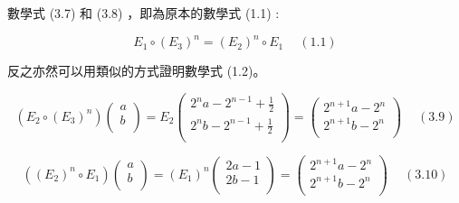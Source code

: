 \documentclass[11pt,UTF8]{ctexart}
\begin{document}
數學式 (3.7) 和 (3.8) ，即為原本的數學式 (1.1) :

$$E_{1} \circ (E_{3})^n = (E_{2})^n \circ E_{1} \quad \ (1.1) $$

反之亦然可以用類似的方式證明數學式 (1.2)。

$$(E_2 \circ {(E_3)}^n)\left(\begin{matrix}a\\b\\\end{matrix}\right)=E_2\left(\begin{matrix}2^na-2^{n-1}+\frac{1}{2}\\2^nb-2^{n-1}+\frac{1}{2}\\\end{matrix}\right)=\left(\begin{matrix}2^{n+1}a-2^n\\2^{n+1}b-2^n\\\end{matrix}\right) \quad \ (3.9) $$

$$({(E_2)}^n \circ E_1)\left(\begin{matrix}a\\b\\\end{matrix}\right)={(E_1)}^n\left(\begin{matrix}2a-1\\2b-1\\\end{matrix}\right)=\left(\begin{matrix}2^{n+1}a-2^n\\2^{n+1}b-2^n\\\end{matrix}\right) \quad \ (3.10) $$

\clearpage
\end{document}
